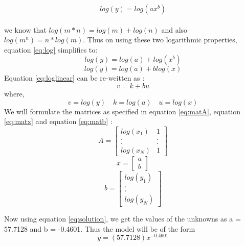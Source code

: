 \documentclass[12pt]{article}
\begin{document}
\begin{equation}
log(y) = log(ax^b)
\label{eq:log}
\end{equation} \\
we know that $log(m*n) = log(m) + log(n)$ and also $log(m^n) = n* log(m)$. Thus on using these two logarithmic properties, equation \ref{eq:log} simplifies to:
\begin{equation}
log(y) = log(a) + log(x^b) 
\end{equation}
\begin{equation}
log(y) = log(a) + blog(x) \label{eq:loglinear}
\end{equation}
Equation \ref{eq:loglinear} can be re-weitten as :
\begin{equation}
v = k + bu
\label{eq:simplifiedloglinear}
\end{equation}
where,
\begin{equation}
v = log(y) \quad
k = log(a) \quad
u = log(x)
\end{equation}
We will formulate the matrices as specified in equation \ref{eq:matA}, equation \ref{eq:matx} and  equation \ref{eq:matb} : 
\begin{equation}
A = 
	\begin{bmatrix}
	log(x_1) & 1 \\
	. & . \\
	. & . \\
	log(x_N) & 1 	
	\end{bmatrix}
\end{equation}
\begin{equation}
x = 
	\begin{bmatrix}
	a \\
	b 	
	\end{bmatrix}
\end{equation}
\begin{equation}
b = 
	\begin{bmatrix}
	log(y_1) \\
	. \\
	. \\
	log(y_N)
	\end{bmatrix}
\end{equation}

Now using equation \ref{eq:solution}, we get the values of the unknowns as a = 57.7128 and b = -0.4601. Thus the model will be of the form
\begin{equation}
y = (57.7128) x ^ {-0.4601}
\label{ans:Cpower}
\end{equation}

\newpage
\end{document}
